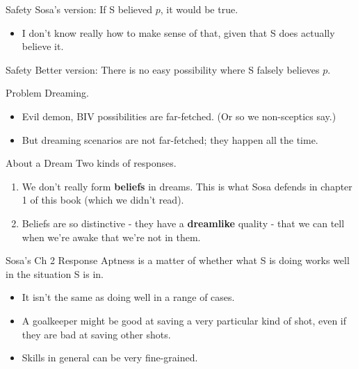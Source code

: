 \documentclass[
  17pt,
  letterpaper,
  ignorenonframetext,
  aspectratio=169,
]{beamer}
\providecommand{\tightlist}{%
  \setlength{\itemsep}{0pt}\setlength{\parskip}{0pt}}\usepackage{longtable,booktabs,array}
\begin{document}
\begin{frame}{Safety}
\protect\hypertarget{safety}{}
Sosa's version: If S believed \(p\), it would be true.

\begin{itemize}[<+->]
\tightlist
\item
  I don't know really how to make sense of that, given that S does
  actually believe it.
\end{itemize}
\end{frame}

\begin{frame}{Safety}
\protect\hypertarget{safety-1}{}
Better version: There is no easy possibility where S falsely believes
\(p\).
\end{frame}

\begin{frame}{Problem}
\protect\hypertarget{problem}{}
Dreaming.

\begin{itemize}[<+->]
\tightlist
\item
  Evil demon, BIV possibilities are far-fetched. (Or so we non-sceptics
  say.)
\item
  But dreaming scenarios are not far-fetched; they happen all the time.
\end{itemize}
\end{frame}

\begin{frame}{About a Dream}
\protect\hypertarget{about-a-dream}{}
Two kinds of responses.

\begin{enumerate}[<+->]
\tightlist
\item
  We don't really form \textbf{beliefs} in dreams. This is what Sosa
  defends in chapter 1 of this book (which we didn't read).
\item
  Beliefs are so distinctive - they have a \textbf{dreamlike} quality -
  that we can tell when we're awake that we're not in them.
\end{enumerate}
\end{frame}

\begin{frame}{Sosa's Ch 2 Response}
\protect\hypertarget{sosas-ch-2-response}{}
Aptness is a matter of whether what S is doing works well in the
situation S is in.

\begin{itemize}[<+->]
\tightlist
\item
  It isn't the same as doing well in a range of cases.
\item
  A goalkeeper might be good at saving a very particular kind of shot,
  even if they are bad at saving other shots.
\item
  Skills in general can be very fine-grained.
\end{itemize}
\end{frame}
\end{document}
